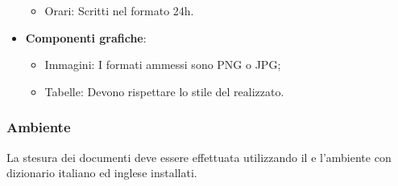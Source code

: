 \begin{itemize}
\begin{itemize}
                    \item Orari: Scritti nel formato 24h.
                \end{itemize}
            \item \textbf{Componenti grafiche}:
                \begin{itemize}
                    \item Immagini: I formati ammessi sono PNG o JPG;
                    \item Tabelle: Devono rispettare lo stile del   realizzato.
                \end{itemize}
        \end{itemize}


\subsubsection{Ambiente}
La stesura dei documenti deve essere effettuata utilizzando il 
 e l’ambiente  con dizionario italiano ed inglese installati.

